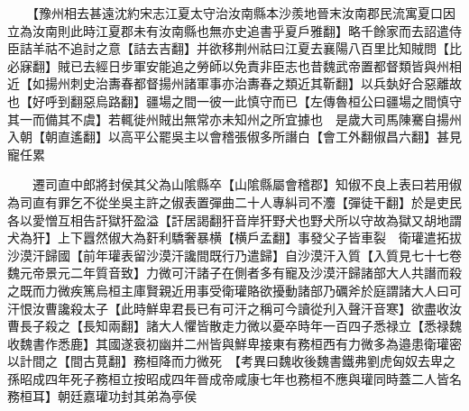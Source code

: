 　　【豫州相去甚遠沈約宋志江夏太守治汝南縣本沙羨地晉末汝南郡民流寓夏口因立為汝南則此時江夏郡未有汝南縣也無亦史追書乎夏戶雅翻】略千餘家而去詔遣侍臣詰羊祜不追討之意【詰去吉翻】并欲移荆州祜曰江夏去襄陽八百里比知賊問【比必寐翻】賊已去經日步軍安能追之勞師以免責非臣志也昔魏武帝置都督類皆與州相近【如揚州刺史治夀春都督揚州諸軍事亦治夀春之類近其靳翻】以兵埶好合惡離故也【好呼到翻惡烏路翻】疆場之間一彼一此慎守而已【左傳魯桓公曰疆場之間慎守其一而備其不虞】若輒徙州賊出無常亦未知州之所宜據也　是歲大司馬陳騫自揚州入朝【朝直遙翻】以高平公罷吳主以會稽張俶多所譖白【會工外翻俶昌六翻】甚見寵任累

　　遷司直中郎將封侯其父為山隂縣卒【山隂縣屬會稽郡】知俶不良上表曰若用俶為司直有罪乞不從坐吳主許之俶表置彈曲二十人專糾司不灋【彈徒干翻】於是吏民各以愛憎互相告訐獄犴盈溢【訐居謁翻犴音岸犴野犬也野犬所以守故為獄又胡地謂犬為犴】上下囂然俶大為姧利驕奢暴横【横戶孟翻】事發父子皆車裂　衛瓘遣拓拔沙漠汗歸國【前年瓘表留沙漠汗讒間既行乃遣歸】自沙漠汗入質【入質見七十七卷魏元帝景元二年質音致】力微可汗諸子在側者多有寵及沙漠汗歸諸部大人共譖而殺之既而力微疾篤烏桓主庫賢親近用事受衛瓘賂欲擾動諸部乃礪斧於庭謂諸大人曰可汗恨汝曹讒殺太子【此時鮮卑君長已有可汗之稱可今讀從刋入聲汗音寒】欲盡收汝曹長子殺之【長知兩翻】諸大人懼皆散走力微以憂卒時年一百四子悉禄立【悉禄魏收魏書作悉鹿】其國遂衰初幽并二州皆與鮮卑接東有務桓西有力微多為邉患衛瓘密以計間之【間古莧翻】務桓降而力微死　【考異曰魏收後魏書鐵弗劉虎匈奴去卑之孫昭成四年死子務桓立按昭成四年晉成帝咸康七年也務桓不應與瓘同時蓋二人皆名務桓耳】朝廷嘉瓘功封其弟為亭侯

